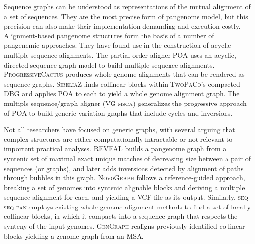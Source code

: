 Sequence graphs \cite{hein1989new} can be understood as representations of the mutual alignment of a set of sequences.
They are the most precise form of pangenome model, but this precision can also make their implementation demanding and execution costly.
Alignment-based pangenome structures form the basis of a number of pangenomic approaches.
They have found use in the construction of acyclic multiple sequence alignments.
The partial order aligner \textsc{POA} \cite{Lee_2002,Grasso_2004} uses an acyclic, directed sequence graph model to build multiple sequence alignments.
\textsc{ProgressiveCactus} \cite{Armstrong_2019} produces whole genome alignments that can be rendered as sequence graphs.
\textsc{SibeliaZ} \cite{Minkin_2019} finds collinear blocks within \textsc{TwoPaCo}'s compacted DBG and applies \textsc{POA} to each to yield a whole genome alignment graph.
The multiple sequence/graph aligner (\textsc{VG msga}) \cite{Novak_2017a,Garrison_2018,Garrison_2019} generalizes the progressive approach of \textsc{POA} to build generic variation graphs that include cycles and inversions.

Not all researchers have focused on generic graphs, with several arguing that complex structures are either computationally intractable or not relevant to important practical analyses.
\textsc{REVEAL} \cite{linthorst2015scalable} builds a pangenome graph from a syntenic set of maximal exact unique matches of decreasing size between a pair of sequences (or graphs), and later adds inversions detected by alignment of paths through bubbles in this graph.
\textsc{NovoGraph} \cite{Biederstedt2018} follows a reference-guided approach, breaking a set of genomes into syntenic alignable blocks and deriving a multiple sequence alignment for each, and yielding a VCF file as its output.
Similarly, \textsc{seq-seq-pan} \cite{Jandrasits_2018} employs existing whole genome alignment methods to find a set of locally collinear blocks, in which it compacts into a sequence graph that respects the synteny of the input genomes.
\textsc{GenGraph} \cite{Ambler_2019} realigns previously identified co-linear blocks yielding a genome graph from an MSA.

